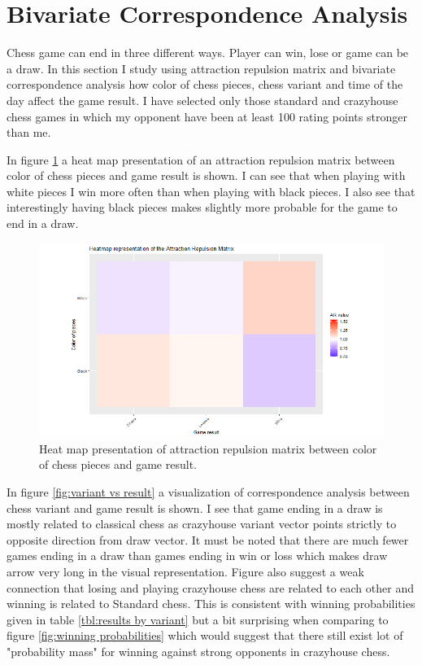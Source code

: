 \section{Bivariate Correspondence Analysis}
\label{sec:bivariate}

Chess game can end in three different ways. Player can win, lose or game can be a draw. In this section I study using attraction repulsion matrix and bivariate correspondence analysis how color of chess pieces, chess variant and time of the day affect the game result. I have selected only those standard and crazyhouse chess games in which my opponent have been at least 100 rating points stronger than me.

In figure \ref{fig:color vs result} a heat map presentation of an attraction repulsion matrix between color of chess pieces and game result is shown. I can see that when playing with white pieces I win more often than when playing with black pieces. I also see that interestingly having black pieces makes slightly more probable for the game to end in a draw.

\begin{figure}[ht!]
    \includegraphics[width=.7\textwidth]{../img/color_and_result.png}
    \caption{Heat map presentation of attraction repulsion matrix between color of chess pieces and game result.}
    \label{fig:color vs result}
\end{figure}

In figure \ref{fig:variant vs result} a visualization of correspondence analysis between chess variant and game result is shown. I see that game ending in a draw is mostly related to classical chess as crazyhouse variant vector points strictly to opposite direction from draw vector. It must be noted that there are much fewer games ending in a draw than games ending in win or loss which makes draw arrow very long in the visual representation. Figure also suggest a weak connection that losing and playing crazyhouse chess are related to each other and winning is related to Standard chess. This is consistent with winning probabilities given in table \ref{tbl:results by variant} but a bit surprising when comparing to figure \ref{fig:winning probabilities} which would suggest that there still exist lot of "probability mass" for winning against strong opponents in crazyhouse chess.


